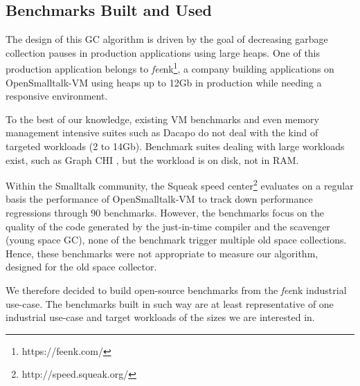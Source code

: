 \documentclass[sigplan,10pt,review,anonymous]{acmart}\settopmatter{printfolios=true,printccs=false,printacmref=false}
\def\feenk{\textit{fee}\textsf{nk}\xspace}
\def\OpenSmalltalkVM{OpenSmalltalk-VM\xspace}
\begin{document}

\subsection{Benchmarks Built and Used}
The design of this GC algorithm is driven by the goal of decreasing garbage collection pauses in production applications using large heaps. One of this production application belongs to \feenk\footnote{https://feenk.com/}, a company building applications on \OpenSmalltalkVM using heaps up to 12Gb in production while needing a responsive environment. 

To the best of our knowledge, existing VM benchmarks and even memory management intensive suites such as Dacapo \cite{DacapoBench} do not deal with the kind of targeted workloads (2 to 14Gb). Benchmark suites dealing with large workloads exist, such as Graph CHI \cite{GraphCHI}, but the workload is on disk, not in RAM. 

Within the Smalltalk community, the Squeak speed center\footnote{http://speed.squeak.org/} evaluates on a regular basis the performance of \OpenSmalltalkVM to track down performance regressions through 90 benchmarks. However, the benchmarks focus on the quality of the code generated by the just-in-time compiler and the scavenger (young space GC), none of the benchmark trigger multiple old space collections. Hence, these benchmarks were not appropriate to measure our algorithm, designed for the old space collector.

We therefore decided to build open-source benchmarks from the \feenk industrial use-case. The benchmarks built in such way are at least representative of one industrial use-case and target workloads of the sizes we are interested in.
\end{document}
